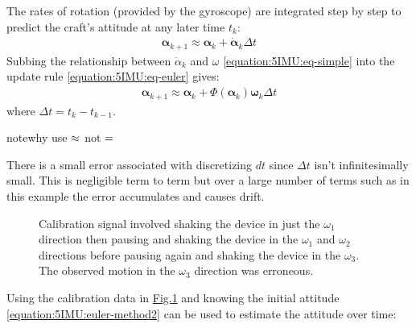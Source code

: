 \documentclass[letterpaper,10pt,english]{jupyterBook}
\begin{document}
\sphinxAtStartPar
The rates of rotation (provided by the gyroscope) are integrated step by step to predict the craft’s attitude at any later time \(t_k\):
\begin{equation}\label{equation:5IMU:eq-euler}
\begin{split}\boldsymbol{\alpha}_{k+1} \approx \boldsymbol{\alpha}_k + \dot{\boldsymbol{\alpha}}_k \Delta t\end{split}
\end{equation}
\sphinxAtStartPar
Subbing the relationship between \(\dot{\alpha}_k\) and \(\omega\) \eqref{equation:5IMU:eq-simple} into the update rule \eqref{equation:5IMU:eq-euler} gives:
\begin{equation}\label{equation:5IMU:euler-method2}
\begin{split}\boldsymbol{\alpha}_{k+1} \approx \boldsymbol{\alpha}_{k} + \Phi(\boldsymbol{\alpha}_k) \boldsymbol{\omega}_k \Delta t\end{split}
\end{equation}
\sphinxAtStartPar
where \(\Delta t = t_k - t_{k-1}\).

\begin{sphinxadmonition}{note}{why use \protect\(\approx\protect\) not \protect\(=\protect\)}

\sphinxAtStartPar
There is a small error associated with discretizing \(dt\) since \(\Delta t\) isn’t infinitesimally small. This is negligible term to term but over a large number of terms such as in this example the error accumulates and causes drift.
\end{sphinxadmonition}

\begin{figure}[htbp]
\centering
\capstart

\noindent{}
\caption{Calibration signal involved shaking the device in just the \(\omega_1\) direction then pausing and shaking the device in the \(\omega_1\) and \(\omega_2\) directions before pausing again and shaking the device in the \(\omega_3\). The observed motion in the \(\omega_3\) direction was erroneous. }\label{\detokenize{5IMU:cal1}}\end{figure}

\sphinxAtStartPar
Using the calibration data in \hyperref[\detokenize{5IMU:cal1}]{Fig.\@ \ref{\detokenize{5IMU:cal1}}} and knowing the initial attitude \eqref{equation:5IMU:euler-method2} can be used to estimate the attitude over time:
\end{document}
